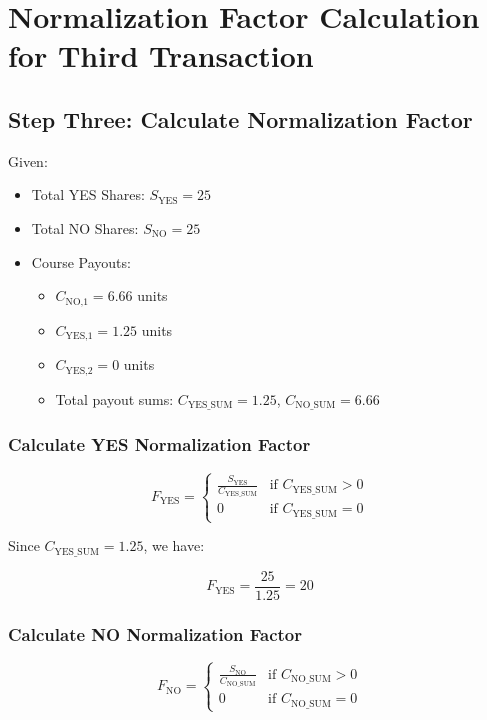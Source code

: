 \documentclass{article}
\begin{document}
\newpage

\section*{Normalization Factor Calculation for Third Transaction}

\subsection*{Step Three: Calculate Normalization Factor}

Given:
\begin{itemize}
    \item Total YES Shares: \( S_{\text{YES}} = 25 \)
    \item Total NO Shares: \( S_{\text{NO}} = 25 \)
    \item Course Payouts:
    \begin{itemize}
        \item \( C_{\text{NO,1}} = 6.66 \) units
        \item \( C_{\text{YES,1}} = 1.25 \) units
        \item \( C_{\text{YES,2}} = 0 \) units
        \item Total payout sums: \( C_{\text{YES\_SUM}} = 1.25 \), \( C_{\text{NO\_SUM}} = 6.66 \)
    \end{itemize}
\end{itemize}

\subsubsection*{Calculate YES Normalization Factor}

\[
F_{\text{YES}} =
\begin{cases}
      \frac{S_{\text{YES}}}{C_{\text{YES\_SUM}}} & \text{if } C_{\text{YES\_SUM}} > 0 \\
      0 & \text{if } C_{\text{YES\_SUM}} = 0
   \end{cases}
\]

Since \( C_{\text{YES\_SUM}} = 1.25 \), we have:

\[
F_{\text{YES}} = \frac{25}{1.25} = 20
\]

\subsubsection*{Calculate NO Normalization Factor}

\[
F_{\text{NO}} =
\begin{cases}
      \frac{S_{\text{NO}}}{C_{\text{NO\_SUM}}} & \text{if } C_{\text{NO\_SUM}} > 0 \\
      0 & \text{if } C_{\text{NO\_SUM}} = 0
   \end{cases}
\]
\end{document}
